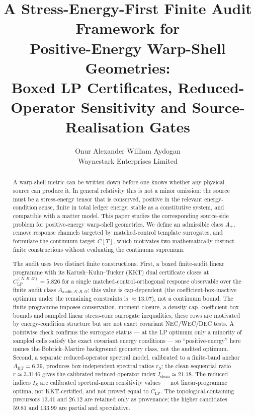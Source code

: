 \documentclass[11pt,a4paper]{article}
\title{A Stress-Energy-First Finite Audit Framework for\\
       Positive-Energy Warp-Shell Geometries:\\
       \large Boxed LP Certificates, Reduced-Operator Sensitivity and Source-Realisation Gates}
\author{Onur Alexander William Aydogan\\
        Waynestark Enterprises Limited}
\date{}
\begin{document}
\maketitle

\begin{abstract}
A warp-shell metric can be written down before one knows whether any physical source can produce it. In general relativity this is not a minor omission: the source must be a stress-energy tensor that is conserved, positive in the relevant energy-condition sense, finite in total ledger energy, stable as a constitutive system, and compatible with a matter model. This paper studies the corresponding source-side problem for positive-energy warp-shell geometries. We define an admissible class $A_{+}$, remove response channels targeted by matched-control template surrogates, and formulate the continuum target $C[T]$, which motivates two mathematically distinct finite constructions without evaluating the continuum supremum.

The audit uses two distinct finite constructions. First, a boxed finite-audit linear programme with its Karush--Kuhn--Tucker (KKT) dual certificate closes at $C_{\mathrm{LP}}^{(N,B,\Omega)}=5.826$ for a single matched-control-orthogonal response observable over the finite audit class $A_{\mathrm{audit},N,B,\Omega}$; this value is cap-dependent (the coefficient-box-inactive optimum under the remaining constraints is $\approx13.07$), not a continuum bound. The finite programme imposes conservation, moment closure, a density cap, coefficient box bounds and sampled linear stress-cone surrogate inequalities; these rows are motivated by energy-condition structure but are not exact covariant NEC/WEC/DEC tests. A pointwise check confirms the surrogate status --- at the LP optimum only a minority of sampled cells satisfy the exact covariant energy conditions --- so ``positive-energy'' here names the Bobrick--Martire background geometry class, not the audited optimum. Second, a separate reduced-operator spectral model, calibrated to a finite-band anchor $A_{\mathrm{HT}}=6.39$, produces box-independent spectral ratios $r_{S}$; the clean sequential ratio $r\simeq3.3146$ gives the calibrated reduced-operator index $I_{\mathrm{clean}}\simeq21.18$. The reduced indices $I_{S}$ are calibrated spectral-norm sensitivity values --- not linear-programme optima, not KKT-certified, and not proved equal to $C_{\mathrm{LP}}$. The topological-containing precursors $13.41$ and $26.12$ are retained only as provenance; the higher candidates $59.81$ and $133.99$ are partial and speculative.


\end{abstract}
\end{document}
